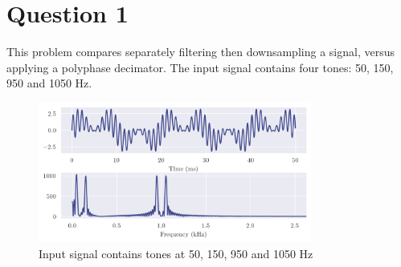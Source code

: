 \section*{Question 1}

This problem compares separately filtering then downsampling a signal, versus applying a polyphase decimator. The input signal contains four tones: 50, 150, 950 and 1050 Hz.

\begin{figure}[ht]
    \centering
    \includegraphics[width=0.8\textwidth]{images/q1_signal.png}
    \caption{Input signal contains tones at 50, 150, 950 and 1050 Hz}
    \label{fig:q1_signal}
\end{figure}

